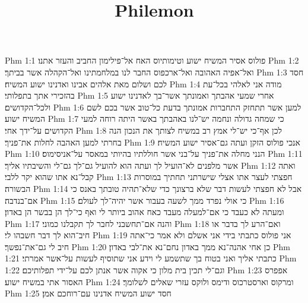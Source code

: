 

\title{Philemon}

Phm 1:1  פולוס אסיר המשיח ישוע וטימותיוס האח אל־פילימון החביב והעזר אתנו׃
Phm 1:2  ואל־אפיה האהובה ואל־ארכפוס החבר לנו במלחמתינו ואל־הקהלה אשר בביתך׃
Phm 1:3  חסד לכם ושלום מאת אלהים אבינו ואדנינו ישוע המשיח׃
Phm 1:4  מודה אני לאלהי בכל־עת בהזכירי אתך בתפלותי׃
Phm 1:5  אחרי שמעי אהבתך ואמונתך אשר־בך לאדנינו ישוע ולכל־הקדושים׃
Phm 1:6  למען אשר תתחזק התחברות אמונתך בדעת כל־טוב אשר בכם לשם המשיח ישוע׃
Phm 1:7  כי שמחה גדולה ונחמה יש־לנו באהבתך באשר היתה רוחה למעי הקדושים על־ידך אחי׃
Phm 1:8  לכן אף־כי יש־לי אמץ רב במשיח לצותך את הנכון הנה בחרתי למען האהבה לחלות את־פניך׃
Phm 1:9  אנכי פולוס הזקן ועתה גם־אסיר ישוע המשיח׃
Phm 1:10  הנני מחלה את־פניך על־בני אשר חוללתיו בהיותי במאסר על־אניסימוס׃
Phm 1:11  אשר מלפנים לא־הועיל לך ועתה הוא להועיל גם־לך גם־לי והשיבתיו אליך׃
Phm 1:12  ואתה קבל־נא אתו שהוא יקר ללבי׃
Phm 1:13  חפצתי לעצר אתו אצלי שישרתני תחתיך במוסרות הבשורה׃
Phm 1:14  אבל לא חפצתי לעשות דבר שלא ברצונך כדי שלא־תהיה טובתך באנס כי אם־בנדבה׃
Phm 1:15  כי אולי נפרד ממך לשעה בעבור אשר יהיה־לך לעולם׃
Phm 1:16  ומעתה לא כעבד כי אם־למעלה מעבד כאח אהוב ביותר לי ואף כי־לך הן בבשר הן באדון׃
Phm 1:17  והנה אם־תחשבני לחבר לך תקבלנו כמוני׃
Phm 1:18  ואם־הרע לך בדבר או חיב־הוא לך דבר חשבהו לי׃
Phm 1:19  אני פולוס כתבתי בידי אני אשלם ולא אמר כי־אתה חיב לי גם־את־נפשך׃
Phm 1:20  כן אחי אהנה־נא ממך באדון נחם־נא את־לבי באדון׃
Phm 1:21  כתבתי אליך ואני בטוח בך שתשמע לי וידע אני שתוסיף לעשות על־אשר אמרתי׃
Phm 1:22  וגם־לי תכין בית מלון כי אקוה אשר אנתן לכם על־ידי תפלותיכם׃
Phm 1:23  אפפרס האסור אתי במשיח ישוע׃
Phm 1:24  ומרקוס וארסטרכוס ודימס ולוקס עזרי שאלים לשלומך׃
Phm 1:25  חסד ישוע המשיח אדנינו עם־רוחכם אמן׃


